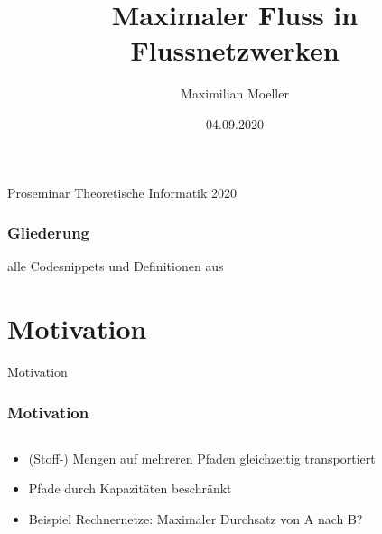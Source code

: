 \documentclass[draft]{beamer}
\author{Maximilian Moeller}
\title{Maximaler Fluss in Flussnetzwerken}
\date{04.09.2020}
\begin{document}
\begin{frame}
\maketitle
\center\large Proseminar Theoretische Informatik 2020
\end{frame}

\begin{frame}
\frametitle{Gliederung}
\tableofcontents
{}
alle Codesnippets und Definitionen aus \citep{Cormen09}
\end{frame}

\section*{Motivation}
\begin{frame}[plain]
\begin{center}
\begin{LARGE}
Motivation
\end{LARGE}
\end{center}
\end{frame}

\begin{frame}
\frametitle{Motivation}
\begin{columns}
\begin{column}{.4\textwidth}
\begin{itemize}
\item (Stoff-) Mengen auf mehreren Pfaden gleichzeitig transportiert
\item Pfade durch Kapazitäten beschränkt\pause
\item Beispiel Rechnernetze: Maximaler Durchsatz von A nach B?
\end{itemize}
\end{column}
\begin{column}{.6\textwidth}
\end{column}
\end{columns}
\end{frame}
\end{document}
